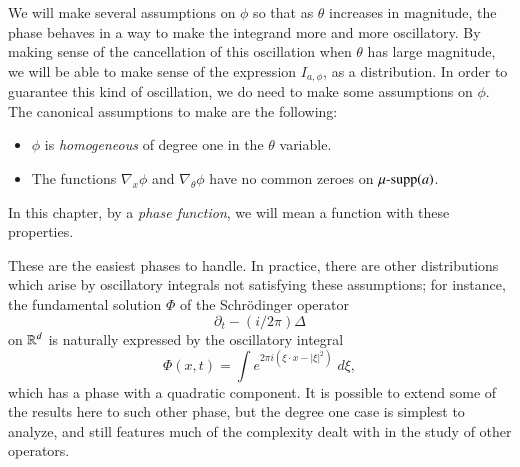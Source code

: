 We will make several assumptions on $\phi$ so that as $\theta$ increases in magnitude, the phase behaves in a way to make the integrand more and more oscillatory. By making sense of the cancellation of this oscillation when $\theta$ has large magnitude, we will be able to make sense of the expression $I_{a,\phi}$, as a distribution. In order to guarantee this kind of oscillation, we do need to make some assumptions on $\phi$. The canonical assumptions to make are the following:
%
\begin{itemize}
    \item $\phi$ is \emph{homogeneous} of degree one in the $\theta$ variable.

    \item The functions $\nabla_x \phi$ and $\nabla_\theta \phi$ have no common zeroes on $\operatorname{\text{$\mu$-supp}}(a)$.
\end{itemize}
%
In this chapter, by a \emph{phase function}, we will mean a function with these properties.

These are the easiest phases to handle. In practice, there are other distributions which arise by oscillatory integrals not satisfying these assumptions; for instance, the fundamental solution $\Phi$ of the Schr\"{o}dinger operator
%
\[ \partial_t - (i/2\pi) \Delta \]
%
on $\operatorname{\mathbb{R}}^d$ is naturally expressed by the oscillatory integral
%
\[ \Phi(x,t) = \int e^{2 \pi i ( \xi \cdot x - |\xi|^2 )}\; d\xi, \]
%
which has a phase with a quadratic component. It is possible to extend some of the results here to such other phase, but the degree one case is simplest to analyze, and still features much of the complexity dealt with in the study of other operators.

